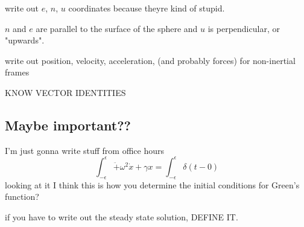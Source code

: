 \documentclass[fleqn]{article}
\begin{document}
write out $e$, $n$, $u$ coordinates because theyre kind of stupid. 

$n$ and $e$ are parallel to the surface of the sphere and $u$ is perpendicular, or 
"upwards". 

write out position, velocity, acceleration, (and probably forces)
for non-inertial frames 

KNOW VECTOR IDENTITIES




\subsection{Maybe important??}
I'm just gonna write stuff from office hours
\[
\int^{\epsilon}_{- \epsilon} \ddot + \omega^2 \dot x + \gamma x = 
\int^{\epsilon}_{- \epsilon} \delta(t - 0)
\]
looking at it I think this is how you determine the initial conditions for 
Green's function?

if you have to write out the steady state solution, DEFINE IT.
\end{document}
